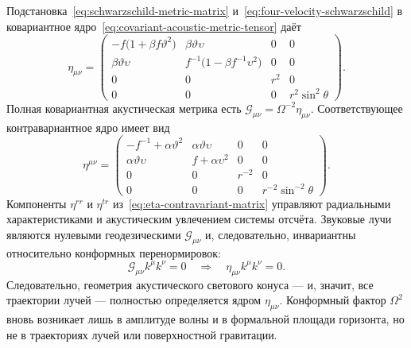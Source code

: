 \documentclass[12pt,a4paper,preprint]{elsarticle}
\begin{document}
            Подстановка~\eqref{eq:schwarzschild-metric-matrix} и~\eqref{eq:four-velocity-schwarzschild} в ковариантное ядро~\eqref{eq:covariant-acoustic-metric-tensor} даёт
            \begin{equation}
                \eta_{\mu\nu} =
                \begin{pmatrix}
                    -f\bigl(1+\beta f\vartheta^{2}\bigr) &
                    \beta\vartheta\upsilon & 0 & 0 \\
                    \beta\vartheta\upsilon &
                    f^{-1}\bigl(1-\beta f^{-1}\upsilon^{2}\bigr) & 0 & 0 \\
                    0 & 0 & r^{2} & 0 \\
                    0 & 0 & 0 & r^{2}\sin^{2}\theta
                \end{pmatrix} .
                \label{eq:eta-covariant-matrix}
            \end{equation}
            Полная ковариантная акустическая метрика есть $\mathcal{G}_{\mu\nu}=\Omega^{-2}\eta_{\mu\nu}$. Соответствующее контравариантное ядро имеет вид
            \begin{equation}
                \eta^{\mu\nu} =
                \begin{pmatrix}
                    -f^{-1}+\alpha\vartheta^{2} &
                    \alpha\vartheta\upsilon & 0 & 0 \\
                    \alpha\vartheta\upsilon &
                    f+\alpha\upsilon^{2} & 0 & 0 \\
                    0 & 0 & r^{-2} & 0 \\
                    0 & 0 & 0 & r^{-2}\sin^{-2}\theta
                \end{pmatrix} .
                \label{eq:eta-contravariant-matrix}
            \end{equation}
            Компоненты $\eta^{rr}$ и $\eta^{tr}$ из~\eqref{eq:eta-contravariant-matrix} управляют радиальными характеристиками и акустическим увлечением системы отсчёта. Звуковые лучи являются нулевыми геодезическими $\mathcal{G}_{\mu\nu}$ и, следовательно, инвариантны относительно конформных перенормировок:
            \begin{equation}
                \mathcal{G}_{\mu\nu}k^{\mu}k^{\nu}=0 \quad\Longrightarrow\quad \eta_{\mu\nu}k^{\mu}k^{\nu} = 0 .
                \label{eq:acoustic-null-condition}
            \end{equation}
            Следовательно, геометрия акустического светового конуса --- и, значит, все траектории лучей --- полностью определяется ядром $\eta_{\mu\nu}$. Конформный фактор $\Omega^{2}$ вновь возникает лишь в амплитуде волны и в формальной площади горизонта, но не в траекториях лучей или поверхностной гравитации.
\end{document}
